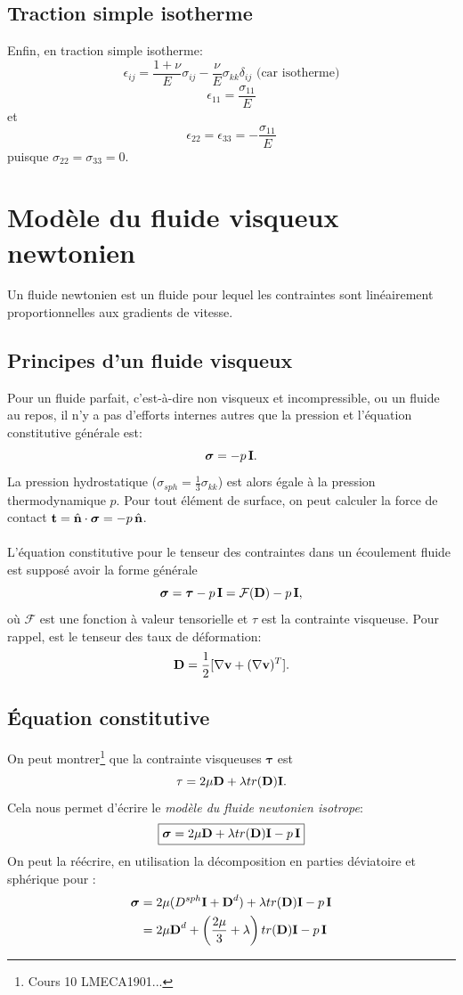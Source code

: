 \subsection{Traction simple isotherme}
Enfin, en traction simple isotherme:
$$\epsilon_{ij}=\frac{1+\nu}{E}\sigma_{ij}-\frac{\nu}{E}\sigma_{kk}\delta_{ij} \text{ (car isotherme)}$$
$$\epsilon_{11}=\frac{\sigma_{11}}{E}$$ et
$$\epsilon_{22}=\epsilon_{33}=-\frac{\sigma_{11}}{E}$$ puisque $\sigma_{22}=\sigma_{33}=0.$

\section{Modèle du fluide visqueux newtonien}
Un fluide newtonien est un fluide pour lequel les contraintes sont linéairement proportionnelles aux gradients de vitesse.
\subsection{Principes d'un fluide visqueux}
Pour un fluide parfait, c'est-à-dire non visqueux et incompressible, ou un fluide au repos, il n'y a pas d'efforts internes autres que la pression et l'équation constitutive générale est:
$$\boldsymbol{\sigma}=-p\,\textbf{I}.$$ La pression hydrostatique ($\sigma_{sph}=\frac{1}{3}\sigma_{kk}$) est alors égale à la pression thermodynamique $p$. Pour tout élément de surface, on peut calculer la force de contact $\textbf{t}=\hat{\textbf{n}}\cdot\boldsymbol{\sigma}=-p\,\hat{\textbf{n}}$.
\paragraph{}
L'équation constitutive pour le tenseur des contraintes dans un écoulement fluide est supposé avoir la forme générale $$\boldsymbol{\sigma}=\boldsymbol{\tau}-p\,\textbf{I}=\mathcal{F}(\textbf{D})-p\,\textbf{I},$$ où $\mathcal{F}$ est une fonction à valeur tensorielle et $\tau$ est la contrainte visqueuse. Pour rappel,  est le tenseur des taux de déformation:
$$\textbf{D}=\frac{1}{2}[\nabla\textbf{v}+(\nabla\textbf{v})^T].$$

\subsection{\'Equation constitutive}
On peut montrer\footnote{Cours 10 LMECA1901...} que la contrainte visqueuses $\boldsymbol{\tau}$ est
$$\tau=2\mu\textbf{D}+\lambda tr(\textbf{D})\textbf{I}.$$ Cela nous permet d'écrire le \emph{modèle du fluide newtonien isotrope}:
$$\boxed{\boldsymbol{\sigma}=2\mu\textbf{D}+\lambda tr(\textbf{D})\textbf{I}-p\,\textbf{I}}$$
On peut la réécrire, en utilisation la décomposition en parties déviatoire et sphérique pour :
\begin{align*}
\boldsymbol{\sigma}&=2\mu(D^{sph}\textbf{I}+\textbf{D}^d)+\lambda tr(\textbf{D})\textbf{I}-p\,\textbf{I}\\
 &=2\mu\textbf{D}^d+\left(\frac{2\mu}{3}+\lambda\right)tr(\textbf{D})\textbf{I}-p\,\textbf{I}
\end{align*}
